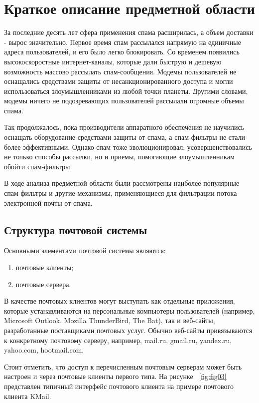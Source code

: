 \section{Краткое описание предметной области}
За последние десять лет сфера применения спама расширилась, а объем доставки - вырос значительно. Первое время спам рассылался напрямую на единичные адреса пользователей, и его было легко блокировать. Со временем появились высокоскоростные интернет-каналы, которые дали быструю и дешевую возможность массово рассылать спам-сообщения. Модемы пользователей не оснащались средствами защиты от несанкционированного доступа и могли использоваться злоумышленниками из любой точки планеты. Другими словами, модемы ничего не подозревающих пользователей рассылали огромные объемы спама.

Так продолжалось, пока производители аппаратного обеспечения не научились оснащать оборудование средствами защиты от спама, а спам-фильтры не стали более эффективными. Однако спам тоже эволюционировал: усовершенствовались не только способы рассылки, но и приемы, помогающие злоумышленникам обойти спам-фильтры. 

В ходе анализа предметной области были рассмотрены наиболее популярные спам-фильтры и другие механизмы, применяющиеся для фильтрации потока электронной почты от спама.

\subsection{Структура почтовой системы}
Основными элементами почтовой системы являются:
\begin{enumerate}
  \item почтовые клиенты;
  \item почтовые сервера.
\end{enumerate}

В качестве почтовых клиентов могут выступать как отдельные приложения, которые устанавливаются на персональные компьютеры пользователей (например, Microsoft Outlook, Mozilla ThunderBird, The Bat), так и веб-сайты, разработанные поставщиками почтовых услуг. Обычно веб-сайты привязываются к конкретному почтовому серверу, например, mail.ru, gmail.ru, yandex.ru, yahoo.com, hootmail.com.

Стоит отметить, что доступ к перечисленным почтовым серверам может быть настроен и через почтовые клиенты первого типа. На рисунке ~\ref{fig:fig03} представлен типичный интерфейс почтового клиента на примере почтового клиента KMail.

